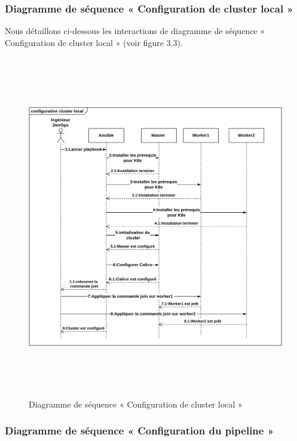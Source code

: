                 \subsubsection{\selectfont\Large Diagramme de séquence « Configuration de cluster local » }
                Nous détaillons ci-dessous les interactions de diagramme de séquence « Configuration de cluster local » (voir figure 3.3). 
                \begin{figure}[H]
                    \begin{center}
                    \includegraphics[height=15cm,width=18cm]{SEQCLUSTER.png}
                    \end{center}
                    \caption{Diagramme de séquence « Configuration de cluster local »}
                    \end{figure}\subsubsection{\selectfont\Large Diagramme de séquence « Configuration du pipeline » }
